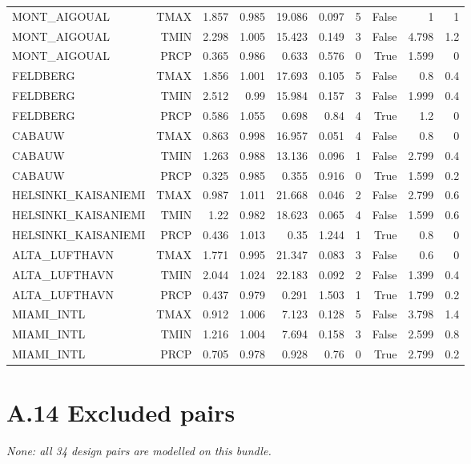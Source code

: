 \documentclass[10pt,a4paper]{article}
\begin{document}
{\begin{longtable}{lrrrrrrrrr}
MONT\_\allowbreak{}AIGOUAL & TMAX & 1.857 & 0.985 & 19.086 & 0.097 & 5 & False & 1 & 1 \\
MONT\_\allowbreak{}AIGOUAL & TMIN & 2.298 & 1.005 & 15.423 & 0.149 & 3 & False & 4.798 & 1.2 \\
MONT\_\allowbreak{}AIGOUAL & PRCP & 0.365 & 0.986 & 0.633 & 0.576 & 0 & True & 1.599 & 0 \\
FELDBERG & TMAX & 1.856 & 1.001 & 17.693 & 0.105 & 5 & False & 0.8 & 0.4 \\
FELDBERG & TMIN & 2.512 & 0.99 & 15.984 & 0.157 & 3 & False & 1.999 & 0.4 \\
FELDBERG & PRCP & 0.586 & 1.055 & 0.698 & 0.84 & 4 & True & 1.2 & 0 \\
CABAUW & TMAX & 0.863 & 0.998 & 16.957 & 0.051 & 4 & False & 0.8 & 0 \\
CABAUW & TMIN & 1.263 & 0.988 & 13.136 & 0.096 & 1 & False & 2.799 & 0.4 \\
CABAUW & PRCP & 0.325 & 0.985 & 0.355 & 0.916 & 0 & True & 1.599 & 0.2 \\
HELSINKI\_\allowbreak{}KAISANIEMI & TMAX & 0.987 & 1.011 & 21.668 & 0.046 & 2 & False & 2.799 & 0.6 \\
HELSINKI\_\allowbreak{}KAISANIEMI & TMIN & 1.22 & 0.982 & 18.623 & 0.065 & 4 & False & 1.599 & 0.6 \\
HELSINKI\_\allowbreak{}KAISANIEMI & PRCP & 0.436 & 1.013 & 0.35 & 1.244 & 1 & True & 0.8 & 0 \\
ALTA\_\allowbreak{}LUFTHAVN & TMAX & 1.771 & 0.995 & 21.347 & 0.083 & 3 & False & 0.6 & 0 \\
ALTA\_\allowbreak{}LUFTHAVN & TMIN & 2.044 & 1.024 & 22.183 & 0.092 & 2 & False & 1.399 & 0.4 \\
ALTA\_\allowbreak{}LUFTHAVN & PRCP & 0.437 & 0.979 & 0.291 & 1.503 & 1 & True & 1.799 & 0.2 \\
MIAMI\_\allowbreak{}INTL & TMAX & 0.912 & 1.006 & 7.123 & 0.128 & 5 & False & 3.798 & 1.4 \\
MIAMI\_\allowbreak{}INTL & TMIN & 1.216 & 1.004 & 7.694 & 0.158 & 3 & False & 2.599 & 0.8 \\
MIAMI\_\allowbreak{}INTL & PRCP & 0.705 & 0.978 & 0.928 & 0.76 & 0 & True & 2.799 & 0.2 \\
\end{longtable}
}

\section*{A.14 Excluded pairs}
\emph{None: all 34 design pairs are modelled on this bundle.}
\end{document}
